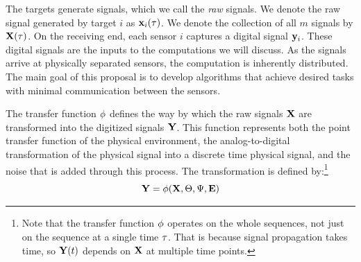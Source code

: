 \documentclass{article}
\begin{document}
The targets generate signals, which we call the {\em raw} signals. We denote the raw signal generated by target $i$ as $\mathbf{x}_i(\tau)$. We denote the collection of all $m$ signals by $\mathbf{X}(\tau)$. On the receiving end, each sensor $i$ captures a digital signal $\mathbf{y}_i$. These digital signals are the inputs to the computations we will discuss. As the signals arrive at physically separated sensors, the computation is inherently distributed. The main goal of this proposal is to develop algorithms that achieve desired tasks with minimal communication between the sensors.

The transfer function $\phi$ defines the way by which the raw signals $\mathbf{X}$ are transformed into the digitized signals $\mathbf{Y}$. This function represents both the point transfer function of the physical environment,
the analog-to-digital transformation of the physical signal into a discrete time physical signal, and the noise that is added through this process. The transformation is defined by:\footnote{Note that the transfer function $\phi$ operates on the whole sequences, not just on the sequence at a single time $\tau$. That is because signal propagation takes time, so $\mathbf{Y}(t)$ depends on $\mathbf{X}$ at multiple time points.}
\[
\mathbf{Y} = \phi(\mathbf{X},\Theta,\Psi,\mathbf{E})
\]
\end{document}

